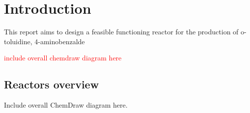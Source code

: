 \section{Introduction}
This report aims to design a feasible functioning reactor for the production of o-toluidine, 4-aminobenzalde


\textcolor{red}{include overall chemdraw diagram here}
\subsection{Reactors overview}
Include overall ChemDraw diagram here. 




